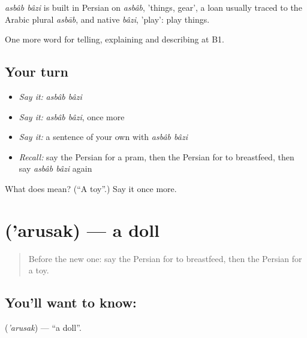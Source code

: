 \begin{cousinweb}
\emph{asbâb bâzi} is built in Persian on \emph{asbâb}, 'things, gear', a loan usually traced to the Arabic plural \emph{asbāb}, and native \emph{bâzi}, 'play': play things.
\end{cousinweb}

\begin{grammarlens}[title={What you've built}]
One more word for telling, explaining and describing at B1.
\end{grammarlens}

\subsection*{Your turn}
\begin{itemize}
\raggedright
  \item \emph{Say it:} \emph{asbâb bâzi}
  \item \emph{Say it:} \emph{asbâb bâzi}, once more
  \item \emph{Say it:} a sentence of your own with \emph{asbâb bâzi}
  \item \emph{Recall:} say the Persian for a pram, then the Persian for to breastfeed, then say \emph{asbâb bâzi} again
\end{itemize}

\begin{tcolorbox}[breakable,colback=teal!4,colframe=teal!35!black,title={Before you move on}]
What does   mean? (\textquotedblleft{}A toy\textquotedblright{}.) Say it once more.
\end{tcolorbox}
\section[\texorpdfstring{\fa{عروسک} ('arusak)}{عروسک ('arusak)}]{ ('arusak) — a doll}

\label{lesson:FA-C503-arusak}



\begin{quote}
Before the new one: say the Persian for to breastfeed, then the Persian for a toy.
\end{quote}

\subsection*{You'll want to know: }
\textbf{} (\emph{'arusak}) — \textquotedblleft{}a doll\textquotedblright{}.

